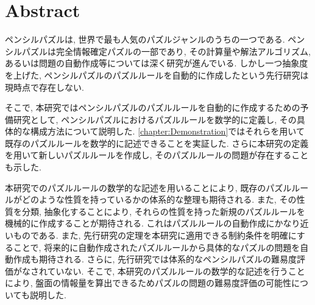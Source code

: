 \chapter*{{\rm \bf Abstract}}\label{chapter:Abstract}
ペンシルパズルは, 世界で最も人気のパズルジャンルのうちの一つである. ペンシルパズルは完全情報確定パズルの一部であり, その計算量や解法アルゴリズム, あるいは問題の自動作成等については深く研究が進んでいる. しかし一つ抽象度を上げた, ペンシルパズルのパズルルールを自動的に作成したという先行研究は現時点で存在しない.

そこで, 本研究ではペンシルパズルのパズルルールを自動的に作成するための予備研究として, ペンシルパズルにおけるパズルルールを数学的に定義し, その具体的な構成方法について説明した. \cref{chapter:Demonstration}ではそれらを用いて既存のパズルルールを数学的に記述できることを実証した. さらに本研究の定義を用いて新しいパズルルールを作成し, そのパズルルールの問題が存在することも示した.

本研究でのパズルルールの数学的な記述を用いることにより, 既存のパズルルールがどのような性質を持っているかの体系的な整理も期待される. また, その性質を分類, 抽象化することにより, それらの性質を持った新規のパズルルールを機械的に作成することが期待される. これはパズルルールの自動作成にかなり近いものである. また, 先行研究の定理を本研究に適用できる制約条件を明確にすることで, 将来的に自動作成されたパズルルールから具体的なパズルの問題を自動作成も期待される. さらに, 先行研究では体系的なペンシルパズルの難易度評価がなされていない. そこで, 本研究のパズルルールの数学的な記述を行うことにより, 盤面の情報量を算出できるためパズルの問題の難易度評価の可能性についても説明した.